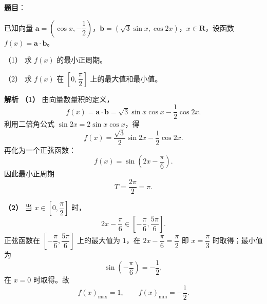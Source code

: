 \begin{answer}

\textbf{题目}：

已知向量 $\boldsymbol a=\left(\cos x,-\dfrac12\right)$，$\boldsymbol b=\left(\sqrt3\sin x,\cos2x\right)$，$x\in\mathbf R$，设函数 $f(x)=\boldsymbol a\cdot\boldsymbol b$。

（1） 求 $f(x)$ 的最小正周期。

（2） 求 $f(x)$ 在 $\left[0,\dfrac\pi2\right]$ 上的最大值和最小值。

\textbf{解析}
\textbf{（1）} 由向量数量积的定义，
\nopagebreak[4]
\[f(x)=\boldsymbol a\cdot\boldsymbol b
=\sqrt3\sin x\cos x-\frac12\cos2x.\]
利用二倍角公式 $\sin2x=2\sin x\cos x$，得
\nopagebreak[4]
\[f(x)=\frac{\sqrt3}{2}\sin2x-\frac12\cos2x.\]
再化为一个正弦函数：
\nopagebreak[4]
\[f(x)=\sin\left(2x-\frac\pi6\right).\]
因此最小正周期
\nopagebreak[4]
\[T=\frac{2\pi}{2}=\pi.\]

\textbf{（2）} 当 $x\in\left[0,\dfrac\pi2\right]$ 时，
\nopagebreak[4]
\[2x-\frac\pi6\in\left[-\frac\pi6,\frac{5\pi}6\right].\]
正弦函数在 $\left[-\dfrac\pi6,\dfrac{5\pi}6\right]$ 上的最大值为 $1$，在 $2x-\dfrac\pi6=\dfrac\pi2$ 即 $x=\dfrac\pi3$ 时取得；最小值为
\nopagebreak[4]
\[\sin\left(-\frac\pi6\right)=-\frac12,\]
在 $x=0$ 时取得。故
\nopagebreak[4]
\[f(x)_{\max}=1,\qquad f(x)_{\min}=-\frac12.\]



\end{answer}
